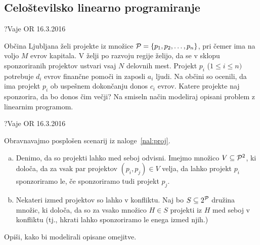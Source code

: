 \subsection{Celoštevilsko linearno programiranje}

\begin{naloga}{}{?}{Vaje OR 16.3.2016}
\begin{vprasanje}
\label{nal:proj}
Občina Ljubljana želi projekte iz množice
$\mathcal{P} = \{p_1, p_2, \dots, p_n\}$,
pri čemer ima na voljo $M$ evrov kapitala.
V želji po razvoju regije želijo,
da se v sklopu sponzoriranih projektov ustvari vsaj $N$ delovnih mest.
Projekt $p_i$ ($1 \le i \le n)$ potrebuje $d_i$ evrov finančne pomoči
in zaposli $a_i$ ljudi.
Na občini so ocenili,
da ima projekt $p_i$ ob uspešnem dokončanju donos $c_i$ evrov.
Katere projekte naj sponzorira, da bo donos čim večji?
Na smiseln način modeliraj opisani problem z linearnim programom.
\end{vprasanje}
\begin{odgovor}
\end{odgovor}
\end{naloga}


\begin{naloga}{}{?}{Vaje OR 16.3.2016}
\begin{vprasanje}
Obravnavajmo posplošen scenarij iz naloge~\ref{nal:proj}.
\begin{enumerate}[(a)]
\item Denimo, da so projekti lahko med seboj odvisni.
Imejmo množico $V \subseteq \mathcal{P}^2$, ki določa,
da za vsak par projektov $(p_i, p_j) \in V$ velja,
da lahko projekt $p_i$ sponzoriramo le,
če sponzoriramo tudi projekt $p_j$.

\item Nekateri izmed projektov so lahko v konfliktu.
Naj bo $S \subseteq 2^{\mathcal{P}}$ družina množic, ki določa,
da so za vsako množico $H \in S$ projekti iz $H$ med seboj v konfliktu
(tj., hkrati lahko sponzoriramo le enega izmed njih.)
\end{enumerate}
Opiši, kako bi modelirali opisane omejitve.
\end{vprasanje}
\begin{odgovor}
\end{odgovor}
\end{naloga}


